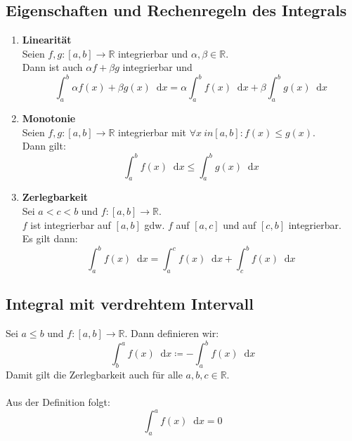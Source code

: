 \documentclass[halfparscip]{scrartcl}
\newcommand*\dif{\mathop{}\!\mathrm{d}}
\newcounter{subsection2}
\begin{document}
\subsection{Eigenschaften und Rechenregeln des Integrals}
\begin{enumerate}
	\item \textbf{Linearität}\\
	Seien $f,g:[a,b] \rightarrow\mathbb{R}$ integrierbar und $\alpha, \beta \in \mathbb{R}$.\\
	Dann ist auch $\alpha f + \beta g$ integrierbar und
	\begin{equation*}
		\int_{a}^{b}\alpha f(x) + \beta g(x) \dif x = \alpha \int_{a}^bf(x)\dif x + \beta \int_a^bg(x)\dif x
	\end{equation*}
	\item \textbf{Monotonie}\\
	Seien $f,g:[a,b] \rightarrow\mathbb{R}$ integrierbar mit $\forall x \ in [a,b] : f(x) \leq g(x)$.\\
	Dann gilt:
	\begin{equation*}
		\int_a^bf(x)\dif x \leq \int_a^bg(x)\dif x
	\end{equation*}
	\item \textbf{Zerlegbarkeit}\\
	Sei $a < c < b$ und $f : [a,b] \rightarrow\mathbb{R}$.\\
	$f$ ist integrierbar auf $[a,b]$ gdw. $f$ auf $[a,c]$ und auf $[c,b]$ integrierbar.\\
	Es gilt dann:
	\begin{equation*}
		\int_a^bf(x)\dif x = \int_a^cf(x)\dif x + \int_c^bf(x)\dif x
	\end{equation*}
\end{enumerate}

\subsection{Integral mit \glqq verdrehtem\grqq{} Intervall}
Sei $a \leq b$ und $f: [a,b] \rightarrow \mathbb{R}$. Dann definieren wir:\\
\begin{equation*}
	\int_b^af(x)\dif x \coloneqq - \int_a^bf(x)\dif x
\end{equation*}
Damit gilt die Zerlegbarkeit auch für alle $a,b,c \in \mathbb{R}$.\\\\
Aus der Definition folgt:
\begin{equation*}
	\int_{a}^{a}f(x) \dif x = 0
\end{equation*}
\end{document}
